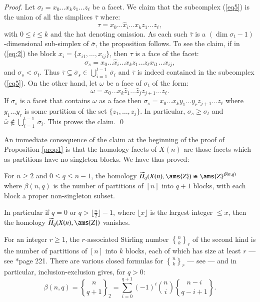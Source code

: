 \documentclass[matann2]{svjour1}
\def\Z{\ams{Z}}
\def\ss{\sigma}
\def\ov{\overline}
\DeclareRobustCommand{\stirling}{\genfrac\{\}{0pt}{}}
\begin{document}
\begin{proof}
Let $\ss_t=x_0\ldots x_k z_1\ldots z_\ell$ be a facet. We claim that
the subcomplex (\ref{eq5}) is the union of all the simplices
$\overline{\tau}$ where:
\begin{equation}
  \label{eq:2}
\tau=x_0\ldots \widehat{x}_i \ldots x_k z_1\ldots z_\ell,
\end{equation}
with $0\leq i\leq k$ and the hat denoting omission. As each such
$\overline{\tau}$ is a $(\dim \sigma_t-1)$-dimensional sub-simplex of
$\overline{\sigma}$, the proposition 
follows. To see the claim, if in (\ref{eq:2}) the block
$x_i=\{x_{i1},\ldots,x_{ij}\}$, then $\tau$ is a face of the facet:
$$
\ss_s=x_0\ldots \widehat{x}_i \ldots x_k z_1\ldots z_\ell x_{i1}\ldots
x_{ij},
$$
and $\ss_s<\ss_t$. Thus $\ov{\tau}\subseteq\ov{\ss}_s\in
  \bigcup_{i=1}^{t-1}\,\overline{\sigma}_i$ and $\ov{\tau}$ is indeed
  contained in the subcomplex (\ref{eq5}).
%
On the other hand, let $\omega$ be a face of $\ss_t$ of the form:
$$
\omega=x_0\ldots x_k \widehat{z}_1\ldots\widehat{z}_jz_{j+1}\ldots z_\ell.
$$
If $\ss_s$ is a facet that contains $\omega$ as a face then
$\ss_s=
x_0\ldots x_k y_1\ldots y_r z_{j+1}\ldots z_\ell$
where $y_1\ldots y_r$ is some partition of the set
$\{z_1,\ldots,z_j\}$. In particular, $\ss_s\geq \ss_t$ and
$\ov{\omega}\not\in \bigcup_{i=1}^{t-1}\,\overline{\sigma}_i$. This
proves the claim. 
  \qed
\end{proof}

An immediate consequence of the claim at the beginning of the proof of
Proposition \ref{prop1} is that the homology facets of $X(n)$ are
those facets which as 
partitions have no singleton blocks. We have thus proved:

\begin{theorem}
  \label{thm:homology}
For $n\geq 2$ and $0\leq q\leq n-1$, the homology
$\widetilde{H}_q(X(n),\Z)\cong\Z^{\,\beta(n,q)}$ where 
$\beta(n,q)$ is the number of partitions of $[n]$ into $q+1$
blocks, with each block a proper non-singleton subset.
\end{theorem}

In particular if $q=0$ or $q>\lfloor\frac{n}{2}\rfloor-1$, 
where $\lfloor x\rfloor$ is the largest integer $\leq x$, 
then the homology $\widetilde{H}_q(X(n),\Z)$ vanishes. 


For an integer $r\geq 1$, the $r$-associated Stirling number
$\stirling{n}{k}_r$ of the
second kind is the number of partitions of $[n]$ into $k$
blocks, each of which has size at least $r$ --- see
\cite{MR0460128}*{page 221}. There are various closed formulas for
$\stirling{n}{k}_r$ --- see \cite{MR0600368} --- and in particular,
inclusion-exclusion gives, for $q>0$:
$$
\beta(n,q)=\stirling{n}{q+1}_2=
\sum_{i=0}^{q+1}(-1)^i\binom{n}{i}\stirling{n-i}{q-i+1}.
$$
\end{document}
